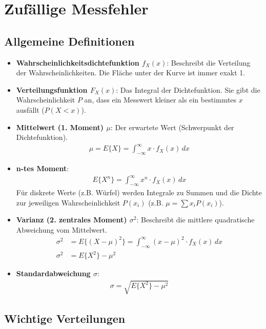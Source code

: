 \section{Zufällige Messfehler}

\subsection{Allgemeine Definitionen}
    \begin{itemize}
        \item \textbf{Wahrscheinlichkeitsdichtefunktion $f_X(x)$}: Beschreibt die Verteilung der Wahrscheinlichkeiten. Die Fläche unter der Kurve ist immer exakt 1.
        \item \textbf{Verteilungsfunktion $F_X(x)$}: Das Integral der Dichtefunktion. Sie gibt die Wahrscheinlichkeit $P$ an, dass ein Messwert kleiner als ein bestimmtes $x$ ausfällt ($P(X < x)$).
        \item \textbf{Mittelwert (1. Moment) $\mu$}: Der erwartete Wert (Schwerpunkt der Dichtefunktion).
        \begin{align*}
            \mu = E\{X\} = \int_{-\infty}^{\infty} x \cdot f_X(x) \, dx
        \end{align*}
        \item \textbf{n-tes Moment}:
        \begin{align*}
            E\{X^n\} = \int_{-\infty}^{\infty} x^n \cdot f_X(x) \, dx
        \end{align*}
        Für diskrete Werte (z.B. Würfel) werden Integrale zu Summen und die Dichte zur jeweiligen Wahrscheinlichkeit $P(x_i)$ (z.B. $\mu = \sum x_i P(x_i)$).
        \item \textbf{Varianz (2. zentrales Moment) $\sigma^2$}: Beschreibt die mittlere quadratische Abweichung vom Mittelwert. 
        \begin{align*}
            \sigma^2 &= E\{(X - \mu)^2\} = \int_{-\infty}^{\infty} (x - \mu)^2 \cdot f_X(x) \, dx \\
            \sigma^2 &= E\{X^2\} - \mu^2
        \end{align*}
        \item \textbf{Standardabweichung $\sigma$}:
        \begin{align*}
            \sigma = \sqrt{E\{X^2\} - \mu^2}
        \end{align*}
    \end{itemize}

\subsection{Wichtige Verteilungen}

